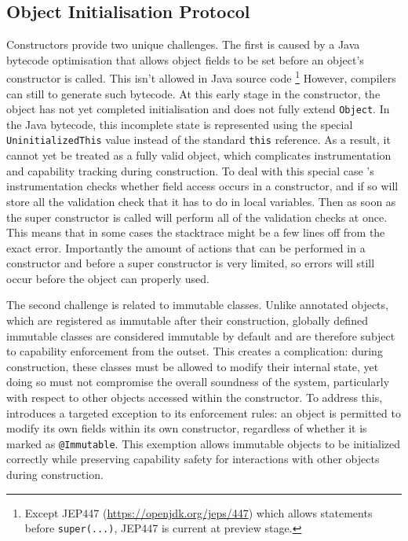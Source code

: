 

\subsection{Object Initialisation Protocol}

Constructors provide two unique challenges. The first is caused by a Java bytecode optimisation that allows object fields to be set before an object's constructor is called. This isn't allowed in Java source code \footnote{Except JEP447 (\url{https://openjdk.org/jeps/447}) which allows statements before \texttt{super(...)}, JEP447 is current at preview stage.} However, compilers  can still to generate such bytecode. At this early stage in the constructor, the object has not yet completed initialisation and does not fully extend  \texttt{Object}. In the Java bytecode, this incomplete state is represented using the special \texttt{UninitializedThis} value instead of the standard \texttt{this} reference. As a result, it cannot yet be treated as a fully valid object, which complicates instrumentation and capability tracking during construction.
To deal with this special case \jdala 's instrumentation checks whether field access occurs in a constructor, and if so will store all the validation check that it has to do in local variables. Then as soon as the super constructor is called \jdala will perform all of the validation checks at once. This means that in some cases the stacktrace might be a few lines off from the exact error. Importantly the amount of actions that can be performed in a constructor and before a super constructor is very limited, so errors will still occur before the object can properly used.

The second challenge is related to immutable classes. Unlike annotated objects, which are registered as immutable after their construction, globally defined immutable classes are considered immutable by default and are therefore subject to capability enforcement from the outset. This creates a complication: during construction, these classes must be allowed to modify their internal state, yet doing so must not compromise the overall soundness of the system, particularly with respect to other objects accessed within the constructor.
To address this, \jdala introduces a targeted exception to its enforcement rules: an object is permitted to modify its own fields within its own constructor, regardless of whether it is marked as \texttt{@Immutable}. This exemption allows immutable objects to be initialized correctly while preserving capability safety for interactions with other objects during construction.



